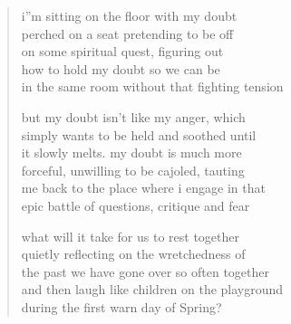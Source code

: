 
\begin{verse}
i''m sitting on the floor with my doubt \\
perched on a seat pretending to be off \\
on some spiritual quest, figuring out \\
how to hold my doubt so we can be  \\
in the same room without that fighting tension

but my doubt isn't like my anger, which \\
simply wants to be held and soothed until \\
it slowly melts. my doubt is much more \\
forceful, unwilling to be cajoled, tauting \\
me back to the place where i engage in that \\
epic battle of questions, critique and fear 

what will it take for us to rest together \\
quietly reflecting on the wretchedness of \\
the past we have gone over so often together \\
and then laugh like children on the playground \\
during the first warn day of Spring?

\end{verse}
